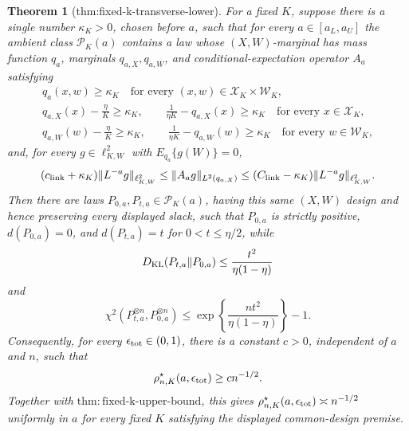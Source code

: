 \documentclass{article}
\newtheorem{theorem}{Theorem}
\begin{document}
\begin{theorem}[thm:fixed-k-transverse-lower]\label{thm:fixed-k-transverse-lower}
For a fixed \(K\), suppose there is a single number \(\kappa_K>0\), chosen before \(a\), such that for every \(a\in[a_L,a_U]\) the ambient class \(\mathcal P_K(a)\) contains a law whose \((X,W)\)-marginal has mass function \(q_a\), marginals \(q_{a,X},q_{a,W}\), and conditional-expectation operator \(A_a\) satisfying
\[
\begin{gathered}
q_a(x,w)\ge \kappa_K\quad\text{for every }(x,w)\in\mathcal X_K\times\mathcal W_K,\\
q_{a,X}(x)-\frac{\eta}{K}\ge\kappa_K,
\qquad \frac{1}{\eta K}-q_{a,X}(x)\ge\kappa_K
\quad\text{for every }x\in\mathcal X_K,\\
q_{a,W}(w)-\frac{\eta}{K}\ge\kappa_K,
\qquad \frac{1}{\eta K}-q_{a,W}(w)\ge\kappa_K
\quad\text{for every }w\in\mathcal W_K,
\end{gathered}
\]
and, for every \(g\in\ell^2_{K,W}\) with \(E_{q_a}\{g(W)\}=0\),
\[
(c_{\rm link}+\kappa_K)\|L^{-a}g\|_{\ell^2_{K,W}}
\le \|A_ag\|_{L^2(q_{a,X})}
\le (C_{\rm link}-\kappa_K)\|L^{-a}g\|_{\ell^2_{K,W}}.
\]
Then there are laws \(P_{0,a},P_{t,a}\in\mathcal P_K(a)\), having this same \((X,W)\) design and hence preserving every displayed slack, such that \(P_{0,a}\) is strictly positive, \(d(P_{0,a})=0\), and \(d(P_{t,a})=t\) for \(0<t\le\eta/2\), while
\[
D_{\rm KL}(P_{t,a}\|P_{0,a})\le\frac{t^2}{\eta(1-\eta)}
\]
and
\[
\chi^2(P_{t,a}^{\otimes n},P_{0,a}^{\otimes n})
\le \exp\!\left\{\frac{nt^2}{\eta(1-\eta)}\right\}-1.
\]
Consequently, for every \(\epsilon_{\rm tot}\in(0,1)\), there is a constant \(c>0\), independent of \(a\) and \(n\), such that
\[
\rho^\star_{n,K}(a,\epsilon_{\rm tot})\ge c n^{-1/2}.
\]
Together with \(\mathrm{thm:fixed\mbox{-}k\mbox{-}upper\mbox{-}bound}\), this gives \(\rho^\star_{n,K}(a,\epsilon_{\rm tot})\asymp n^{-1/2}\) uniformly in \(a\) for every fixed \(K\) satisfying the displayed common-design premise.
\end{theorem}
\end{document}
